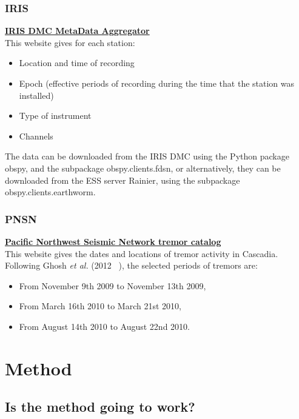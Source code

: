 \documentclass[main.tex]{subfiles}
\begin{document}
\subsection{IRIS}

\href{http://ds.iris.edu/mda}{\textbf{IRIS DMC MetaData Aggregator}} \\

This website gives for each station:
\begin{itemize}
	\item Location and time of recording
	\item Epoch (effective periods of recording during the time that the station was installed)
	\item Type of instrument
	\item Channels
\end{itemize}

The data can be downloaded from the IRIS DMC using the Python package obspy, and the subpackage obspy.clients.fdsn, or alternatively, they can be downloaded from the ESS server Rainier, using the subpackage obspy.clients.earthworm.

\subsection{PNSN}

\href{https://www.pnsn.org/tremor}{\textbf{Pacific Northwest Seismic Network tremor catalog}} \\

This website gives the dates and locations of tremor activity in Cascadia. Following Ghosh \textit{et al.} (2012 ~\cite{GHO_2012}), the selected periods of tremors are:
\begin{itemize}
	\item From November 9th 2009 to November 13th 2009,
	\item From March 16th 2010 to March 21st 2010,
	\item From August 14th 2010 to August 22nd 2010.
\end{itemize}

\chapter{Method}

\section{Is the method going to work?}
\end{document}
